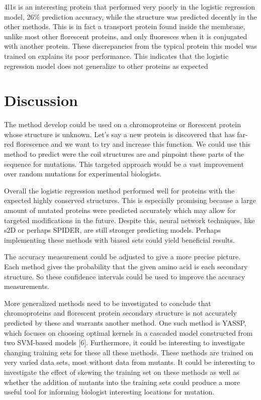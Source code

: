 \documentclass{article}
\begin{document}
4l1s is an interesting protein that performed very poorly in the logistic regression model, 26\% prediction accuracy, while the structure was predicted decently in the other methods. This is in fact a transport protein found inside the membrane, unlike most other florescent proteins, and only fluoresces when it is conjugated with another protein. These discrepancies from the typical protein this model was trained on explains its poor performance. This indicates that the logistic regression model does not generalize to other proteins as expected

\section{Discussion}

The method develop could be used on a chromoproteins or florescent protein whose structure is unknown. Let's say a new protein is discovered that has far-red florescence and we want to try and increase this function. We could use this method to predict were the coil structures are and pinpoint these parts of the sequence for mutations. This targeted approach would be a vast improvement over random mutations for experimental biologists.

Overall the logistic regression method performed well for proteins with the expected highly conserved structures. This is especially promising because a large amount of mutated proteins were predicted accurately which may allow for targeted modifications in the future. Despite this, neural network techniques, like s2D or perhaps SPIDER, are still stronger predicting models. Perhaps implementing these methods with biased sets could yield beneficial results.

The accuracy measurement could be adjusted to give a more precise picture. Each method gives the probability that the given amino acid is each secondary structure. So these confidence intervals could be used to improve the accuracy measurements.

More generalized methods need to be investigated to conclude that chromoproteins and florescent protein secondary structure is not accurately predicted by these and warrants another method. One such method is YASSP, which focuses on choosing optimal kernels in a cascaded model constructed from two SVM-based models [6]. Furthermore, it could be interesting to investigate changing training sets for these all these methods. These methods are trained on very varied data sets, most without data from mutants. It could be interesting to investigate the effect of skewing the training set on these methods as well as whether the addition of mutants into the training sets could produce a more useful tool for informing biologist interesting locations for mutation.
\end{document}
